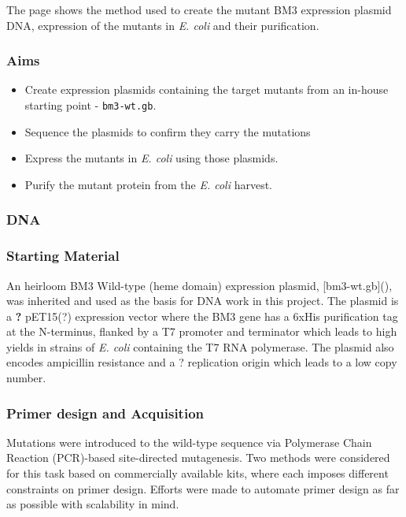 \documentclass{article}
\begin{document}
The page shows the method used to create the mutant BM3 expression plasmid DNA, 
expression of the mutants in \textit{E. coli} and their purification.

\subsubsection{Aims}

\begin{itemize}
	\item Create expression plasmids containing the target mutants from an in-house starting point - \texttt{bm3-wt.gb}.
	\item Sequence the plasmids to confirm they carry the mutations
	\item Express the mutants in \textit{E. coli} using those plasmids.
	\item Purify the mutant protein from the \textit{E. coli} harvest.
\end{itemize}


\subsubsection{DNA}

\subsubsection{Starting Material}

An heirloom BM3 Wild-type (heme domain) expression plasmid, [bm3-wt.gb](), 
was inherited and used as the basis for DNA work in this project.
The plasmid is a \textbf{?} pET15(?) expression vector where the BM3 gene has a 6xHis purification tag at the N-terminus,
flanked by a T7 promoter and terminator which leads to high yields in strains of \textit{E. coli} containing the T7 RNA polymerase.
The plasmid also encodes ampicillin resistance and a ? replication origin which leads to a low copy number.


\subsubsection{Primer design and Acquisition}

Mutations were introduced to the wild-type sequence via Polymerase Chain Reaction (PCR)-based site-directed mutagenesis.
Two methods were considered for this task based on commercially available kits, where each imposes different constraints on primer design.
Efforts were made to automate primer design as far as possible with scalability in mind.
\end{document}
